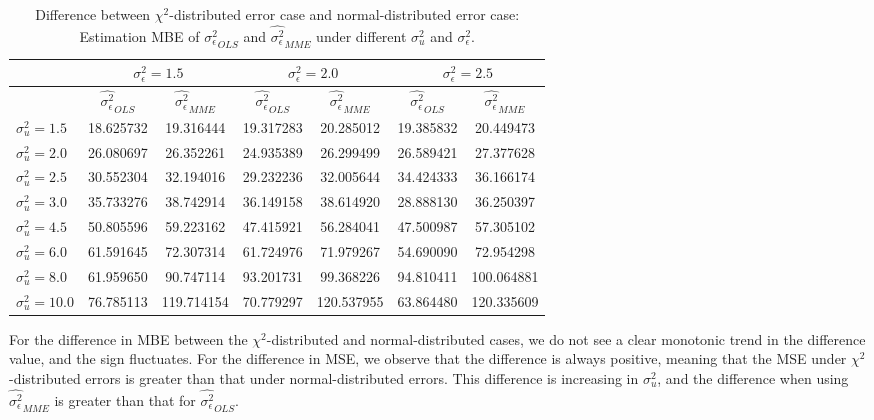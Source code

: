 \documentclass{article}
\begin{document}
\begin{table}[ht]
    \centering
    \caption{Difference between $\chi^2$-distributed error case and normal-distributed error case: Estimation MBE of $\hat{\sigma^2_\epsilon}_{OLS}$ and $\hat{\sigma^2_\epsilon}_{MME}$ under different $\sigma^2_u$ and $\sigma^2_\epsilon$.}
    \label{Tab:MSE_sigma_diff_chi}
    \begin{tabular}[t]{lcccccc}
        \hline
        &\multicolumn{2}{c}{$\sigma^2_\epsilon=1.5$}&\multicolumn{2}{c}{$\sigma^2_\epsilon=2.0$}&\multicolumn{2}{c}{$\sigma^2_\epsilon=2.5$}\\
        \hline
        &$\hat{\sigma^2_\epsilon}_{OLS}$&$\hat{\sigma^2_\epsilon}_{MME}$&$\hat{\sigma^2_\epsilon}_{OLS}$&
        $\hat{\sigma^2_\epsilon}_{MME}$&$\hat{\sigma^2_\epsilon}_{OLS}$&$\hat{\sigma^2_\epsilon}_{MME}$\\
        \hline
        $\sigma^2_u = 1.5$&18.625732&19.316444&19.317283&20.285012&19.385832&20.449473\\
        $\sigma^2_u = 2.0$&26.080697&26.352261&24.935389&26.299499&26.589421&27.377628\\
        $\sigma^2_u = 2.5$&30.552304&32.194016&29.232236&32.005644&34.424333&36.166174\\
        $\sigma^2_u = 3.0$&35.733276&38.742914&36.149158&38.614920&28.888130&36.250397\\
        $\sigma^2_u = 4.5$&50.805596&59.223162&47.415921&56.284041&47.500987&57.305102\\
        $\sigma^2_u = 6.0$&61.591645&72.307314&61.724976&71.979267&54.690090&72.954298\\
        $\sigma^2_u = 8.0$&61.959650&90.747114&93.201731&99.368226&94.810411&100.064881\\
        $\sigma^2_u = 10.0$&76.785113&119.714154&70.779297&120.537955&63.864480&120.335609\\
        \hline
    \end{tabular}
\end{table}

For the difference in MBE between the $\chi^2$-distributed and normal-distributed cases, we do not see a clear monotonic trend in the difference value, and the sign fluctuates. 
For the difference in MSE, we observe that the difference is always positive, meaning that the MSE under $\chi^2$-distributed errors is greater than that under normal-distributed errors.
This difference is increasing in $\sigma^2_u$, and the difference when using $\hat{\sigma^2_\epsilon}_{MME}$ is greater than that for $\hat{\sigma^2_\epsilon}_{OLS}$.
\end{document}
